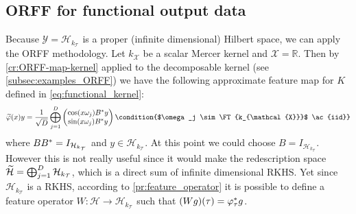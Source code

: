 \subsection{ORFF for functional output data}
Because $\mathcal{Y}=\mathcal{H}_{k_{\mathcal{T}}}$ is a proper (infinite
dimensional) Hilbert space, we can apply the \acs{ORFF} methodology. Let
$k_{\mathcal{X}}$ be a scalar Mercer kernel and $\mathcal{X}=\mathbb{R}$. Then
by \cref{cr:ORFF-map-kernel} applied to the decomposable kernel (see
\cref{subsec:examples_ORFF}) we have the following approximate feature map for
$K$ defined in \cref{eq:functional_kernel}:
\begin{dmath*}
    \tildePhi{\omega}(x)y = \frac{1}{\sqrt{D}}\Vect_{j=1}^D
    \begin{pmatrix}
        \cos(x \omega_j) B^\adjoint y \\
        \sin(x \omega_j) B^\adjoint y
    \end{pmatrix} \condition{$\omega_j \sim \FT{k_{\mathcal{X}}}$
    \ac{iid}}
\end{dmath*}
where $BB^* = I_{\mathcal{H}_{k_{\mathcal{T}}}}$ and
$y\in\mathcal{H}_{k_{\mathcal{T}}}$. At this point we could choose
$B=I_{\mathcal{H}_{k_{\mathcal{T}}}}$. However this is not really useful since
it would make the redescription space $\widetilde{\mathcal{H}}=\operatorname*{\bigoplus}_{j=1}^D
\mathcal{H}_{k_{\mathcal{T}}}$, which is a direct sum of infinite dimensional
\acs{RKHS}. Yet since $\mathcal{H}_{k_{\mathcal{T}}}$ is a \acs{RKHS},
according to \cref{pr:feature_operator} it is possible to define a feature
operator $W:\mathcal{H}\to\mathcal{H}_{k_{\mathcal{T}}}$ such that
$(Wg)(\tau)=\Phi_\tau^\adjoint g$.
